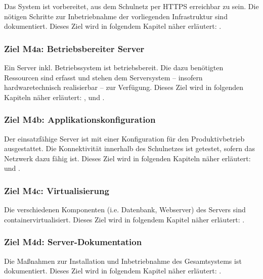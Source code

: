\documentclass[
    headings=optiontotocandhead,%
    twoside,
    numbers=noenddot,%
    toc=flat, %
    12pt, %
    titlepage, %
    parskip=full, %
    listof=totoc, %
    listof=flat, %
    numbers=noenddot, %
    bibliography=totoc, %
    a4paper,DIV=14,
    BCOR=15mm,
]{scrbook}
\begin{document}
    Das System ist vorbereitet, aus dem Schulnetz per HTTPS erreichbar zu sein. Die nötigen Schritte zur Inbetriebnahme der vorliegenden Infrastruktur sind dokumentiert. 
    Dieses Ziel wird in folgendem Kapitel näher erläutert: .
    
   
      \subsubsection*{Ziel M4a: Betriebsbereiter Server}

      Ein Server inkl. Betriebssystem ist betriebsbereit. Die dazu benötigten Ressourcen sind erfasst und stehen dem Serversystem – insofern hardwaretechnisch realisierbar – zur Verfügung.
      Dieses Ziel wird in folgenden Kapiteln näher erläutert: ,  und .
    
      \subsubsection*{Ziel M4b: Applikationskonfiguration}

      Der einsatzfähige Server ist mit einer Konfiguration für den Produktivbetrieb ausgestattet. Die Konnektivität innerhalb des Schulnetzes ist getestet, sofern das Netzwerk dazu fähig ist.
      Dieses Ziel wird in folgenden Kapiteln näher erläutert: und .
      
      \subsubsection*{Ziel M4c: Virtualisierung}

      Die verschiedenen Komponenten (i.e. Datenbank, Webserver) des Servers sind containervirtualisiert.  
      Dieses Ziel wird in folgendem Kapitel näher erläutert: .

      \subsubsection*{Ziel M4d: Server-Dokumentation}

      Die Maßnahmen zur Installation und Inbetriebnahme des Gesamtsystems ist dokumentiert.
      Dieses Ziel wird in folgendem Kapitel näher erläutert: .
\end{document}

